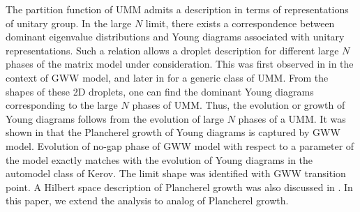 \documentclass[3p,12pt]{elsarticle}
\numberwithin{equation}{section}
\begin{document}
The partition function of UMM admits a description in terms of representations of unitary group. In the large $N$ limit, there exists a correspondence between dominant eigenvalue distributions and Young diagrams associated with unitary representations. Such a relation allows a droplet description for different large $N$ phases of the matrix model under consideration. This was first observed in \cite{duttagopakumar} in the context of GWW model, and later in \cite{riemannzero,Chattopadhyay} for a generic class of UMM. From the shapes of these 2D droplets, one can find the dominant Young diagrams corresponding to the large $N$ phases of UMM. Thus, the evolution or growth of Young diagrams follows from the evolution of large $N$ phases of a UMM. It was shown in \cite{Chattopadhyay:2019pkl} that the Plancherel growth of Young diagrams is captured by GWW model. Evolution of no-gap phase of GWW model with respect to a parameter of the model exactly matches with the evolution of Young diagrams in the automodel class of Kerov. The limit shape was identified with GWW transition point. A Hilbert space description of Plancherel growth was also discussed in \cite{Chattopadhyay:2019pkl}. In this paper, we extend the analysis to \qq analog of Plancherel growth. 
\end{document}
